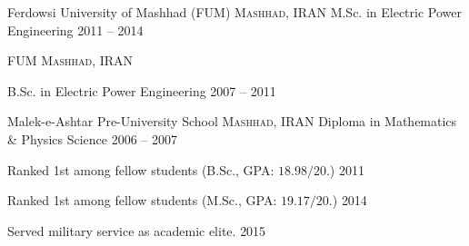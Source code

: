 \documentclass[10pt,a4paper]{article} %
\begin{document}

\headedsection %
{Ferdowsi University of Mashhad (FUM)}
{\textsc{Mashhad, IRAN}} {
\headedsubsection %
{M.Sc. in Electric Power Engineering}
{2011 -- 2014}
{}
}


\headedsection %
{FUM}
{\textsc{Mashhad, IRAN}} {

\headedsubsection %
{B.Sc. in Electric Power Engineering}
{2007 -- 2011}
{}
}


\headedsection %
{Malek-e-Ashtar Pre-University School}
{\textsc{Mashhad, IRAN}} {
\headedsubsection %
{Diploma in Mathematics \& Physics Science}
{2006 -- 2007}
{}
}

\spacedhrule{1.6em}{-0.4em} %



\headedsection %
{Ranked 1st among fellow students (B.Sc., GPA: $18.98/20$.)}
{2011}{}

\headedsection %
{Ranked 1st among fellow students (M.Sc., GPA: $19.17/20$.)}
{2014}{}

\headedsection %
{Served military service as academic elite.}
{2015}{}
\end{document}
